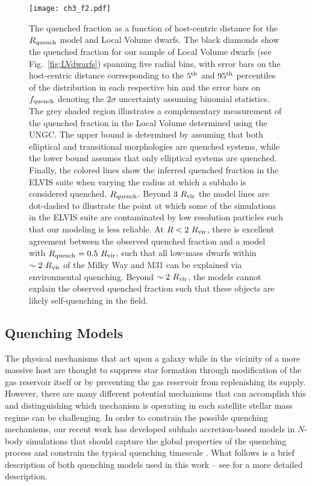 \begin{figure*}
 \centering
 \hspace*{-0.1in}
 \texttt{[image: ch3\_f2.pdf]}
 \caption{The quenched fraction as a function of host-centric distance for the
   $R_{\rm quench}$ model and Local Volume dwarfs. The black diamonds show the
   quenched fraction for our sample of Local Volume dwarfs (see
   Fig.~\ref{fig:LVdwarfs}) spanning five radial bins, with error bars on the
   host-centric distance corresponding to the $5^{\rm th}$ and $95^{\rm th}$
   percentiles of the distribution in each respective bin and the error bars on
   $f_{\rm quench}$ denoting the $2\sigma$ uncertainty assuming binomial
   statistics. The grey shaded region illustrates a complementary measurement of
   the quenched fraction in the Local Volume determined using the UNGC. The
   upper bound is determined by assuming that both elliptical and transitional
   morphologies are quenched systems, while the lower bound assumes that only
   elliptical systems are quenched. Finally, the colored lines show the inferred
   quenched fraction in the ELVIS suite when varying the radius at which a
   subhalo is considered quenched, $R_{\rm quench}$. Beyond $3~R_{\rm{vir}}$
   the model lines are dot-dashed to illustrate the point at which
   some of the simulations in the ELVIS suite are contaminated by low
   resolution particles such that our modeling is less reliable.
   At $R < 2~R_{\rm{vir}}$, there is excellent agreement between the
   observed quenched fraction and a model with 
   $R_{\rm quench}=0.5~R_{\rm{vir}}$, such that all low-mass dwarfs within
   $\sim2~R_{\rm{vir}}$ of the Milky Way and M31 can be explained via environmental
   quenching. Beyond $\sim2~R_{\rm{vir}}$, the models cannot explain the
   observed quenched fraction such that these objects are likely
   self-quenching in the field. }
 \label{fig:rq}
\end{figure*}




\subsection{Quenching Models}
\label{subsec:models}

The physical mechanisms that act upon a galaxy while in the vicinity
of a more massive host are thought to suppress star formation through
modification of the gas reservoir itself or by preventing the gas
reservoir from replenishing its supply. 
%
However, there are many different potential mechanisms that can
accomplish this and distinguishing which mechanism is operating in
each satellite stellar mass regime can be challenging.
%
In order to constrain the possible quenching mechanisms, our recent work has
developed subhalo accretion-based models in $N$-body simulations that
should capture the global properties of the quenching process
and constrain the typical quenching timescale \citep{fham15, wheeler14}.
%
What follows is a brief description of both quenching models used in
this work -- see \citet{fham15} for a more detailed description.
%



